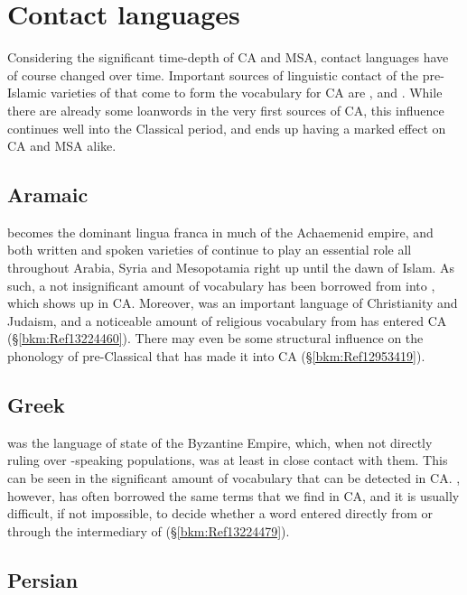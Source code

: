 \documentclass[output=paper]{langsci/langscibook}
\begin{document}
\section{Contact languages}


Considering the significant time-depth of CA and MSA, contact languages have of course changed over time. Important sources of linguistic contact of the pre-Islamic varieties of  that come to form the vocabulary for CA are ,  and . While there are already some  {loanwords} in the very first sources of CA, this influence continues well into the Classical period, and ends up having a marked effect on CA and MSA alike.

\subsection{Aramaic}
 becomes the dominant lingua franca in much of the Achaemenid empire, and both written and spoken varieties of  continue to play an essential role all throughout Arabia, Syria and Mesopotamia right up until the dawn of Islam. As such, a not insignificant amount of vocabulary has been borrowed from  into , which shows up in CA. Moreover,  was an important language of Christianity and Judaism, and a noticeable amount of religious vocabulary from  has entered CA (§\ref{bkm:Ref13224460}). There may even be some structural influence on the phonology of pre-Classical  that has made it into CA (§\ref{bkm:Ref12953419}).

\subsection{Greek}

 was the language of state of the Byzantine Empire, which, when not directly ruling over -speaking populations, was at least in close contact with them. This can be seen in the significant amount of  vocabulary that can be detected in CA. , however, has often borrowed the same terms that we find in CA, and it is usually difficult, if not impossible, to decide whether a  word entered  directly from  or through the intermediary of  (§\ref{bkm:Ref13224479}).

\subsection{Persian}
\end{document}
